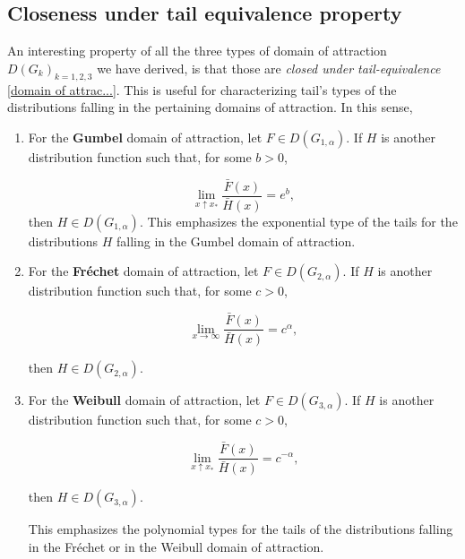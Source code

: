 \documentclass[11pt,a4paper,openany ]{book}
\begin{document}
\subsection{Closeness under tail equivalence property} An interesting property of all the three types of domain of attraction $D(G_{k})_{k=1,2,3}$ we have derived, is that those are \emph{closed under tail-equivalence} \ref{domain of attrac...}. This is useful for characterizing tail's types of the distributions falling in the pertaining domains of attraction. In this sense,

\begin{enumerate}
	\item For the \textbf{Gumbel} domain of attraction,  let $F\in D(G_{1,\alpha})$. If $H$ is another distribution function such that, for some $b>0$, 
	
	\begin{equation}
	\displaystyle{\lim_{ x \uparrow x_*}} \frac{\bar{F}(x)}{\bar{H}(x)}=e^{b},
	\end{equation}
	then $H\in D(G_{1,\alpha})$. This emphasizes the exponential type of the  tails for the distributions $H$ falling in the Gumbel domain of attraction.
	
	
	\item For the \textbf{Fréchet} domain of attraction, let $F\in D(G_{2,\alpha})$. If $H$ is another distribution function such that, for some $c>0$, 
	
	\begin{equation}
	\displaystyle{\lim_{ x \to\infty}} \frac{\bar{F}(x)}{\bar{H}(x)}=c^{\alpha},
	\end{equation}
	
	then $H\in D(G_{2,\alpha})$.
	
	\item For the \textbf{Weibull} domain of attraction,  let $F\in D(G_{3,\alpha})$. If $H$ is another distribution function such that, for some $c>0$, 
	
	\begin{equation}
	\displaystyle{\lim_{ x  \uparrow  x_*}} \frac{\bar{F}(x)}{\bar{H}(x)}=c^{-\alpha},
	\end{equation}
	
	then $H\in D(G_{3,\alpha})$.
	
	This emphasizes the polynomial types for the tails of the distributions falling in the Fréchet or in the Weibull domain of attraction.
\end{enumerate}
\end{document}
